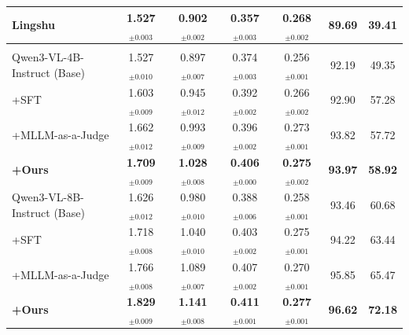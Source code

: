 \documentclass[letterpaper]{article} %
\begin{document}
\begin{table}[!t]
{\begin{tabular}{l|cccc|cc}
Lingshu~\cite{lingshu}
& \textbf{1.527$_{\pm0.003}$} & \textbf{0.902$_{\pm0.002}$} & \textbf{0.357$_{\pm0.003}$} & \textbf{0.268$_{\pm0.002}$} & \textbf{89.69} & \textbf{39.41} \\
\midrule
\rowcolor{rowgray}
\multicolumn{7}{l}{\textit{Qwen-VL series}} \\
Qwen3-VL-4B-Instruct (Base)
& 1.527$_{\pm0.010}$ & 0.897$_{\pm0.007}$ & 0.374$_{\pm0.003}$ & 0.256$_{\pm0.001}$ & 92.19 & 49.35 \\
\quad +SFT
& 1.603$_{\pm0.009}$ & 0.945$_{\pm0.012}$ & 0.392$_{\pm0.002}$ & 0.266$_{\pm0.002}$ & 92.90 & 57.28 \\
\quad +MLLM-as-a-Judge
& 1.662$_{\pm0.012}$ & 0.993$_{\pm0.009}$ & 0.396$_{\pm0.002}$ & 0.273$_{\pm0.001}$ & 93.82 & 57.72 \\
\rowcolor{rowpink}
\quad \textbf{+Ours}
& \textbf{1.709$_{\pm0.009}$} & \textbf{1.028$_{\pm0.008}$} & \textbf{0.406$_{\pm0.000}$} & \textbf{0.275$_{\pm0.002}$} & \textbf{93.97} & \textbf{58.92} \\
Qwen3-VL-8B-Instruct (Base)
& 1.626$_{\pm0.012}$ & 0.980$_{\pm0.010}$ & 0.388$_{\pm0.006}$ & 0.258$_{\pm0.001}$ & 93.46 & 60.68 \\
\quad +SFT
& 1.718$_{\pm0.008}$ & 1.040$_{\pm0.010}$ & 0.403$_{\pm0.002}$ & 0.275$_{\pm0.001}$ & 94.22 & 63.44 \\
\quad +MLLM-as-a-Judge
& 1.766$_{\pm0.008}$ & 1.089$_{\pm0.007}$ & 0.407$_{\pm0.002}$ & 0.270$_{\pm0.001}$ & 95.85 & 65.47 \\
\rowcolor{rowpink}
\quad \textbf{+Ours}
& \textbf{1.829$_{\pm0.009}$} & \textbf{1.141$_{\pm0.008}$} & \textbf{0.411$_{\pm0.001}$} & \textbf{0.277$_{\pm0.001}$} & \textbf{96.62} & \textbf{72.18} \\

\end{tabular}}
\end{table}
\end{document}
